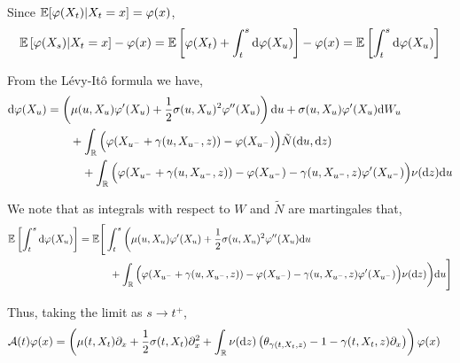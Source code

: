 \begin{solution}[Solution]
Since \( \mathbb{E}[\varphi(X_t)|X_t = x] = \varphi(x) \),
\begin{align*}
    \mathbb{E} \left[ \varphi(X_s) | X_t = x \right] - \varphi(x)
    = \mathbb{E} \left[ \varphi(X_t) + \int_{t}^{s}\mathrm{d} \varphi(X_u) \right] - \varphi(x)
    = \mathbb{E} \left[ \int_{t}^{s}\mathrm{d} \varphi(X_u) \right]
\end{align*}



From the L\'evy-It\^o formula we have,
\begin{align*}
    \mathrm{d} \varphi(X_u)
    &= \left( \mu(u,X_u) \varphi'(X_u) + \dfrac{1}{2}\sigma(u,X_u)^2\varphi''(X_u)\right)\mathrm{d} u
    + \sigma(u,X_u)\varphi'(X_u) \mathrm{d} W_u
    \\&\hspace{2em}+ \int_{\mathbb{R}} \Big(\varphi(X_{u^-}+\gamma(u,X_{u^-},z)) - \varphi(X_{u^-}) \Big) \tilde{N}(\mathrm{d} u, \mathrm{d} z)
    \\&\hspace{3em}+ \int_{\mathbb{R}} \Big(\varphi(X_{u^-}+\gamma(u,X_{u^-},z)) - \varphi(X_{u^-}) - \gamma(u,X_{u^-},z)\varphi'(X_{u^-})\Big) \nu(\mathrm{d} z) \mathrm{d} u
\end{align*}

We note that as integrals with respect to \( W \) and \( \tilde{N}  \) are martingales that,
\begin{align*}
    \mathbb{E} \left[ \int_{t}^{s} \mathrm{d} \varphi(X_u) \right] 
    &= \mathbb{E} \Bigg[ \int_{t}^{s} \bigg( \mu(u,X_u) \varphi'(X_u) + \dfrac{1}{2}\sigma(u,X_u)^2\varphi''(X_u)\mathrm{d} u
    \\&\hspace{3em}+ \int_{\mathbb{R}} \Big(\varphi(X_{u^-}+\gamma(u,X_{u^-},z)) - \varphi(X_{u^-}) - \gamma(u,X_{u^-},z)\varphi'(X_{u^-})\Big) \nu(\mathrm{d} z) \bigg) \mathrm{d} u \Bigg]
\end{align*}

Thus, taking the limit as \( s\to t^+ \),
\begin{align*}
    \mathcal{A} (t) \varphi(x) 
    &= \left( \mu(t,X_t) \partial_x + \dfrac{1}{2} \sigma(t,X_t) \partial_x^2 + \int_{\mathbb{R}} \nu(\mathrm{d} z) \left(\theta_{\gamma(t,X_t,z)} - 1 - \gamma(t,X_t,z) \partial_x\right) \right)\varphi(x)
\end{align*}
\end{solution}

